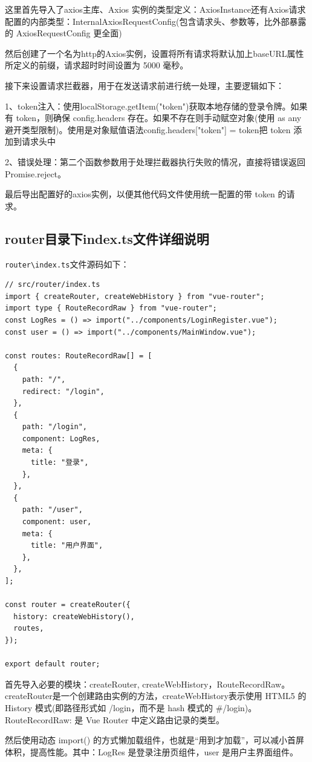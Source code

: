 \documentclass[a4paper,AutoFakeBold={2.7}]{ctexart} %
\begin{document}
这里首先导入了axios主库、Axios 实例的类型定义：AxiosInstance还有Axios请求配置的内部类型：InternalAxiosRequestConfig(包含请求头、参数等，比外部暴露的 AxiosRequestConfig 更全面)

然后创建了一个名为http的Axios实例，设置将所有请求将默认加上baseURL属性所定义的前缀，请求超时时间设置为 5000 毫秒。

接下来设置请求拦截器，用于在发送请求前进行统一处理，主要逻辑如下：

1、token注入：使用localStorage.getItem("token")获取本地存储的登录令牌。如果有 token，则确保 config.headers 存在。如果不存在则手动赋空对象(使用 as any 避开类型限制)。使用是对象赋值语法config.headers["token"] = token把 token 添加到请求头中

2、错误处理：第二个函数参数用于处理拦截器执行失败的情况，直接将错误返回 Promise.reject。

最后导出配置好的axios实例，以便其他代码文件使用统一配置的带 token 的请求。
\subsection{router目录下index.ts文件详细说明}

\verb|router\index.ts|文件源码如下：

\begin{lstlisting}
// src/router/index.ts
import { createRouter, createWebHistory } from "vue-router";
import type { RouteRecordRaw } from "vue-router";
const LogRes = () => import("../components/LoginRegister.vue");
const user = () => import("../components/MainWindow.vue");

const routes: RouteRecordRaw[] = [
  {
    path: "/",
    redirect: "/login",
  },
  {
    path: "/login",
    component: LogRes,
    meta: {
      title: "登录",
    },
  },
  {
    path: "/user",
    component: user,
    meta: {
      title: "用户界面",
    },
  },
];

const router = createRouter({
  history: createWebHistory(),
  routes,
});

export default router;

\end{lstlisting}

首先导入必要的模块：createRouter, createWebHistory，RouteRecordRaw。createRouter是一个创建路由实例的方法，createWebHistory表示使用 HTML5 的 History 模式(即路径形式如 /login，而不是 hash 模式的 \#/login)。RouteRecordRaw: 是 Vue Router 中定义路由记录的类型。

然后使用动态 import() 的方式懒加载组件，也就是“用到才加载”，可以减小首屏体积，提高性能。其中：LogRes 是登录注册页组件，user 是用户主界面组件。
\end{document}
